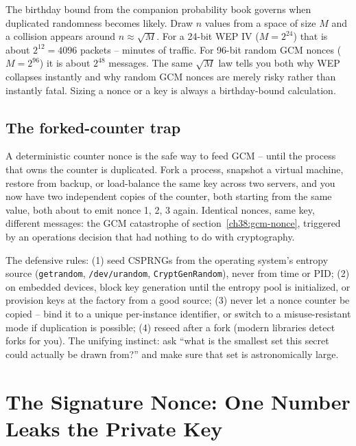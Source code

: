 \begin{connectionbox}
The birthday bound from the companion probability book governs when duplicated randomness becomes likely. Draw $n$ values from a space of size $M$ and a collision appears around $n \approx \sqrt{M}$. For a 24-bit WEP IV ($M = 2^{24}$) that is about $2^{12} = 4096$ packets -- minutes of traffic. For 96-bit random GCM nonces ($M = 2^{96}$) it is about $2^{48}$ messages. The same $\sqrt{M}$ law tells you both why WEP collapses instantly and why random GCM nonces are merely risky rather than instantly fatal. Sizing a nonce or a key is always a birthday-bound calculation.
\end{connectionbox}

\subsection{The forked-counter trap}
\label{ch38:fork-trap}

A deterministic counter nonce is the safe way to feed GCM -- until the process that owns the counter is duplicated. Fork a process, snapshot a virtual machine, restore from backup, or load-balance the same key across two servers, and you now have two independent copies of the counter, both starting from the same value, both about to emit nonce 1, 2, 3 again. Identical nonces, same key, different messages: the GCM catastrophe of section~\ref{ch38:gcm-nonce}, triggered by an operations decision that had nothing to do with cryptography.

\begin{focusbox}
The defensive rules: (1) seed CSPRNGs from the operating system's entropy source (\texttt{getrandom}, \texttt{/dev/urandom}, \texttt{CryptGenRandom}), never from time or PID; (2) on embedded devices, block key generation until the entropy pool is initialized, or provision keys at the factory from a good source; (3) never let a nonce counter be copied -- bind it to a unique per-instance identifier, or switch to a misuse-resistant mode if duplication is possible; (4) reseed after a fork (modern libraries detect forks for you). The unifying instinct: ask ``what is the smallest set this secret could actually be drawn from?'' and make sure that set is astronomically large.
\end{focusbox}

\section{The Signature Nonce: One Number Leaks the Private Key}
\label{ch38:ecdsa-nonce}

